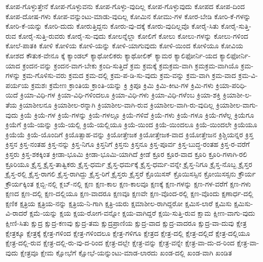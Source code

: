 {ಕೋಪ-ಗೊಳ್ಳುತ್ತೇನೆ
ಕೋಪ-ಗೊಳ್ಳುವನು
ಕೋಪ-ಗೊಳ್ಳು-ವುದಿಲ್ಲ
ಕೋಪ-ಗೊಳ್ಳುವುದು
ಕೋಪದ
ಕೋಪ-ದಿಂದ
ಕೋಪ-ದೋಷ-ಗಳು
ಕೋಪ-ವನ್ನುಂಟು-ಮಾಡು-ವುದಿಲ್ಲ
ಕೋಮಿನ
ಕೋಮು-ಗಳ
ಕೋರ-ಬೇಡಿ
ಕೋರಿ-ಕೆ-ಗಳನ್ನು
ಕೋರಿ-ಕೆ-ಯನ್ನು
ಕೋರಿ-ದುದು
ಕೋರುತ್ತಿದ್ದನು
ಕೋರು-ವು-ದಕ್ಕೆ
ಕೋರು-ವುದಿಲ್ಲವೊ
ಕೋರೈ-ಸಿತು
ಕೋರೈ-ಸುತ್ತಿ-ರುವ
ಕೋರೈ-ಸುತ್ತಿ-ರುವರು
ಕೋರೈ-ಸು-ವುದು
ಕೋಲನ್ನೆಲ್ಲಾ
ಕೋಲಿಗೆ
ಕೋಲು
ಕೋಲು-ಗಳನ್ನು
ಕೋಲು-ಗಳಿಂದ
ಕೋಲೆ-ಪಾತಕಿ
ಕೋಳಿ
ಕೋಳಿಯ
ಕೋಳಿ-ಯನ್ನು
ಕೋಳಿ-ಯಾಗುವುದು
ಕೋಳಿ-ಯಿಂದ
ಕೋಳಿಯೂ
ಕೋವಿಯ
ಕೋಶದ
ಕೌತುಕ-ವೇನೂ
ಕ್ಕೆ
ಕ್ಯಾಂಡಲ್
ಕ್ಯಾಥೋಲಿಕರು
ಕ್ಯಾಥೋಲಿಕ್
ಕ್ಯಾಮರ
ಕ್ಯಾಲಿಫೋರ್ನಿ-ಯದ
ಕ್ಯಾಲಿಫೋರ್ನಿ-ಯಾದ
ಕ್ರಂದನ-ವನ್ನು
ಕ್ರಂದನ-ವಾಗ-ಬೇಕು
ಕ್ರಂದಿ-ಸುತ್ತಿದೆ
ಕ್ರಮ
ಕ್ರಮಕ್ಕೆ
ಕ್ರಮಕ್ರಮ-ವಾಗಿ
ಕ್ರಮಕ್ರಮ-ವಾಗಿಯೊ
ಕ್ರಮ-ಗಳನ್ನು
ಕ್ರಮ-ಗೊಳಿಸು-ವರು
ಕ್ರಮದ
ಕ್ರಮ-ದಲ್ಲಿ
ಕ್ರಮ-ಪ-ಡಿ-ಸು-ವುದು
ಕ್ರಮ-ವನ್ನು
ಕ್ರಮ-ವಾಗಿ
ಕ್ರಮ-ವಾದ
ಕ್ರಮ-ವಿ-ಪರ್ಯಯ
ಕ್ರಮಶಃ
ಕ್ರಮೇಣ
ಕ್ರಾಂತಿಯ
ಕ್ರಾಂತಿ-ಯನ್ನು
ಕ್ರಿ
ಕ್ರಿಪೂ
ಕ್ರಿಮಿ
ಕ್ರಿಮಿ-ಕೀಟ-ಗಳ
ಕ್ರಿಮಿ-ಗಳು
ಕ್ರಿಯಾ-ಪರಿಧಿ-ಯಿದೆ
ಕ್ರಿಯಾ-ವಿಧಿ-ಗಳ
ಕ್ರಿಯಾ-ವಿಧಿ-ಗಳಿಂದಲೂ
ಕ್ರಿಯಾ-ವಿಧಿ-ಗಳು
ಕ್ರಿಯಾ-ವಿಧಿ-ಗಳೆಂಬ
ಕ್ರಿಯಾ-ಶಕ್ತಿ
ಕ್ರಿಯಾಶೀ-ಲ-ತೆಯ
ಕ್ರಿಯಾಶೀಲನೂ
ಕ್ರಿಯಾಶೀಲ-ರನ್ನಾಗಿ
ಕ್ರಿಯಾಶೀಲ-ವಾಗಿ-ರುವ
ಕ್ರಿಯಾಶೀಲ-ವಾಗಿ-ರು-ವುದಿಲ್ಲ
ಕ್ರಿಯಾಶೀಲ-ವಾಗು-ವುದು
ಕ್ರಿಯೆ
ಕ್ರಿಯೆ-ಗಳ
ಕ್ರಿಯೆ-ಗಳನ್ನು
ಕ್ರಿಯೆ-ಗಳಲ್ಲೂ
ಕ್ರಿಯೆ-ಗಳಿವೆ
ಕ್ರಿಯೆ-ಗಳು
ಕ್ರಿಯೆ-ಗಳೂ
ಕ್ರಿಯೆ-ಗಳೆಲ್ಲ
ಕ್ರಿಯೆಗೂ
ಕ್ರಿಯೆಗೆ
ಕ್ರಿಯೆ-ಯನ್ನು
ಕ್ರಿಯೆ-ಯಲ್ಲಿ
ಕ್ರಿಯೆ-ಯಲ್ಲಿಯೂ
ಕ್ರಿಯೆ-ಯಿಂದ
ಕ್ರಿಯೆ-ಯಿಂದಲೂ
ಕ್ರಿಯೆ-ಯಿಂದಲೇ
ಕ್ರಿಯೆಯೂ
ಕ್ರಿಯೆಯೆ
ಕ್ರಿಯೆ-ಯೊಂದಿಗೆ
ಕ್ರಿಯೊತ್ಸಾಹ-ವನ್ನು
ಕ್ರಿಯೋತ್ತೇಜಕ
ಕ್ರಿಯೋತ್ತೇಜಕ-ವಾದ
ಕ್ರಿಯೋತ್ತೇಜನ
ಕ್ರಿಶ್ಚಿಯನ್ನರ
ಕ್ರಿಸ್ತ
ಕ್ರಿಸ್ತನ
ಕ್ರಿಸ್ತ-ನಂತಹ
ಕ್ರಿಸ್ತ-ನನ್ನು
ಕ್ರಿಸ್ತ-ನಿಗೂ
ಕ್ರಿಸ್ತನಿಗೆ
ಕ್ರಿಸ್ತನು
ಕ್ರಿಸ್ತನೂ
ಕ್ರಿಸ್ತ-ಪೂರ್ವ
ಕ್ರಿಸ್ತ-ಬುದ್ಧ-ರಂತಹ
ಕ್ರಿಸ್ತ-ರ-ವರೆಗೆ
ಕ್ರಿಸ್ತರು
ಕ್ರಿಸ್ತ-ಶಕಕ್ಕಿಂತ
ಕ್ರೀಡಾ-ಭೂಮಿ
ಕ್ರೀಡಾ-ಭೂಮಿ-ಯಾಗಿದೆ
ಕ್ರೀಡೆ
ಕ್ರೂರ
ಕ್ರೂರ-ವಾದ
ಕ್ರೂರಿ
ಕ್ರೂರಿ-ಗಳಾಗಿ-ರಲಿ
ಕ್ರೂರಿಯೂ
ಕ್ರೈಸ್ತ
ಕ್ರೈಸ್ತ-ತಾತ್ವಿಕರು
ಕ್ರೈಸ್ತ-ಧರ್ಮ
ಕ್ರೈಸ್ತ-ಧರ್ಮಕ್ಕೆ
ಕ್ರೈಸ್ತ-ಧರ್ಮ-ವನ್ನೇ
ಕ್ರೈಸ್ತ-ನಿಗೂ
ಕ್ರೈಸ್ತ-ನೊಬ್ಬ
ಕ್ರೈಸ್ತರ
ಕ್ರೈಸ್ತ-ರಲ್ಲಿ
ಕ್ರೈಸ್ತ-ರಾಗಲಿ
ಕ್ರೈಸ್ತ-ರಾಗಿದ್ದು
ಕ್ರೈಸ್ತ-ರಿಗೆ
ಕ್ರೈಸ್ತರು
ಕ್ರೈಸ್ತರೆ
ಕ್ರೊಯಿಸಸ್
ಕ್ರೊಯಿಸಸ್ಸಿನ
ಕ್ರೋಯಿಸಸ್ಸನು
ಕ್ರೌರ್ಯ
ಕ್ರೌರ್ಯಕ್ಕಿಂತ
ಕ್ಲಬ್ಬಿ-ನಲ್ಲಿ
ಕ್ಲಬ್-ನಲ್ಲಿ
ಕ್ಷಣ
ಕ್ಷಣ-ಕಾಲ
ಕ್ಷಣ-ಕಾಲವೂ
ಕ್ಷಣಕ್ಕೆ
ಕ್ಷಣ-ಗಳನ್ನು
ಕ್ಷಣ-ಗಳ-ವರೆಗೆ
ಕ್ಷಣ-ಗಳು
ಕ್ಷಣದ
ಕ್ಷಣ-ದಲ್ಲಿ
ಕ್ಷಣ-ದಲ್ಲಿಯೂ
ಕ್ಷಣ-ವಾದರೂ
ಕ್ಷಣವೂ
ಕ್ಷಣವೇ
ಕ್ಷಣ-ವೊಂದ-ರಲ್ಲಿ
ಕ್ಷಣ-ವೊಂದು
ಕ್ಷಣಾರ್ಧ-ದಲ್ಲಿ
ಕ್ಷಣಿಕ
ಕ್ಷತ್ರಿಯ
ಕ್ಷತ್ರಿಯ-ನನ್ನು
ಕ್ಷತ್ರಿಯ-ನಿ-ಗಾಗಿ
ಕ್ಷತ್ರಿ-ಯರು
ಕ್ಷಮಾಶೀಲ-ರಾಗಿದ್ದರೋ
ಕ್ಷಮಿಸ-ಲಾರೆ
ಕ್ಷಮಿಸು
ಕ್ಷಮಿಸು-ವಿ-ರಾದರೆ
ಕ್ಷಮೆ-ಯನ್ನು
ಕ್ಷಯ
ಕ್ಷಯ-ರೋಗ-ವನ್ನೋ
ಕ್ಷಯ-ವಾಗಿದ್ದರೆ
ಕ್ಷಯಿ-ಸುತ್ತಿ-ರುವ
ಕ್ಷಾಮ
ಕ್ಷೀಣ-ವಾಗು-ವುದು
ಕ್ಷೀಣಿ-ಸಿತು
ಕ್ಷುದ್ರ
ಕ್ಷುದ್ರ-ಕಣವು
ಕ್ಷುದ್ರ-ತಮ
ಕ್ಷುದ್ರಪ್ರಾಣಿಯ
ಕ್ಷುದ್ರ-ವಾದ
ಕ್ಷುದ್ರ-ವಾದರೂ
ಕ್ಷುದ್ರ-ವಾ-ದುವು
ಕ್ಷೇತ್ರ
ಕ್ಷೇತ್ರಕ್ಕೂ
ಕ್ಷೇತ್ರಕ್ಕೆ
ಕ್ಷೇತ್ರ-ಗಳಿಂದ
ಕ್ಷೇತ್ರ-ಗಳಿಂದಲೂ
ಕ್ಷೇತ್ರ-ಗಳಿಗೂ
ಕ್ಷೇತ್ರದ
ಕ್ಷೇತ್ರ-ದಲ್ಲಿ
ಕ್ಷೇತ್ರ-ದಲ್ಲಿದೆ
ಕ್ಷೇತ್ರ-ದಲ್ಲಿಯೂ
ಕ್ಷೇತ್ರ-ದಲ್ಲಿ-ರುವ
ಕ್ಷೇತ್ರ-ದಲ್ಲಿ-ರು-ವು-ದ-ರಿಂದ
ಕ್ಷೇತ್ರ-ದಲ್ಲೇ
ಕ್ಷೇತ್ರ-ವನ್ನು
ಕ್ಷೇತ್ರ-ವನ್ನೇ
ಕ್ಷೇತ್ರ-ವಾ-ದು-ದ-ರಿಂದ
ಕ್ಷೇತ್ರ-ವಾ-ವುದು
ಕ್ಷೇತ್ರವೂ
ಕ್ಷೇಮ
ಕ್ಷೋಭೆಗೆ
ಕ್ಷೋಭೆ-ಯನ್ನುಂಟು-ಮಾಡ-ಲಾರದು
ಖಂಡ-ದಲ್ಲಿ
ಖಂಡ-ವಾಗಿ
ಖಂಡಿತ
}
